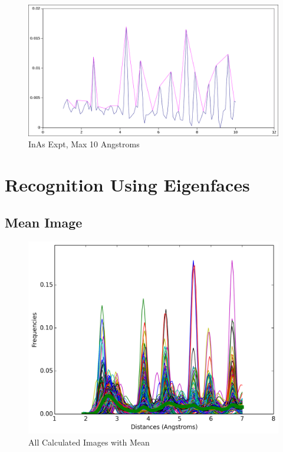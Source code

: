 \documentclass[12pt,letterpaper]{article}
\begin{document}
\begin{figure}[ht]
  \begin{center}
    \includegraphics[scale=0.4]{figs/inas_peaks_10ang.png}
    \caption{InAs Expt, Max 10 Angstroms}
  \end{center}
\end{figure}
\clearpage

\section{Recognition Using Eigenfaces}
\subsection{Mean Image}
\begin{figure}[ht]
  \begin{center}
    \includegraphics[scale=0.8]{figs/all_calc_images_mean.png}
    \caption{All Calculated Images with Mean}
  \end{center}
\end{figure}
\clearpage
\end{document}
